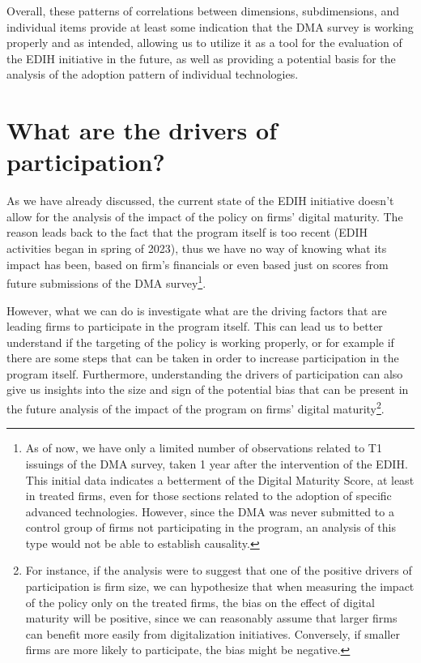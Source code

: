 \documentclass[12pt]{report}
\begin{document}
\par Overall, these patterns of correlations between dimensions, subdimensions, and individual items provide at least some indication that the DMA survey is working properly and as intended, allowing us to utilize it as a tool for the evaluation of the EDIH initiative in the future, as well as providing a potential basis for the analysis of the adoption pattern of individual technologies.





% 









\newpage
\chapter{What are the drivers of participation?}
\par As we have already discussed, the current state of the EDIH initiative doesn't allow for the analysis of the impact of the policy on firms' digital maturity. The reason leads back to the fact that the program itself is too recent (EDIH activities began in spring of 2023), thus we have no way of knowing what its impact has been, based on firm's financials or even based just on scores from future submissions of the DMA survey\footnote{As of now, we have only a limited number of observations related to T1 issuings of the DMA survey, taken 1 year after the intervention of the EDIH. This initial data indicates a betterment of the Digital Maturity Score, at least in treated firms, even for those sections related to the adoption of specific advanced technologies. However, since the DMA was never submitted to a control group of firms not participating in the program, an analysis of this type would not be able to establish causality.}.

\par However, what we can do is investigate what are the driving factors that are leading firms to participate in the program itself. This can lead us to better understand if the targeting of the policy is working properly, or for example if there are some steps that can be taken in order to increase participation in the program itself. Furthermore, understanding the drivers of participation can also give us insights into the size and sign of the potential bias that can be present in the future analysis of the impact of the program on firms' digital maturity\footnote{For instance, if the analysis were to suggest that one of the positive drivers of participation is firm size, we can hypothesize that when measuring the impact of the policy only on the treated firms, the bias on the effect of digital maturity will be positive, since we can reasonably assume that larger firms can benefit more easily from digitalization initiatives. Conversely, if smaller firms are more likely to participate, the bias might be negative.}.
\end{document}
